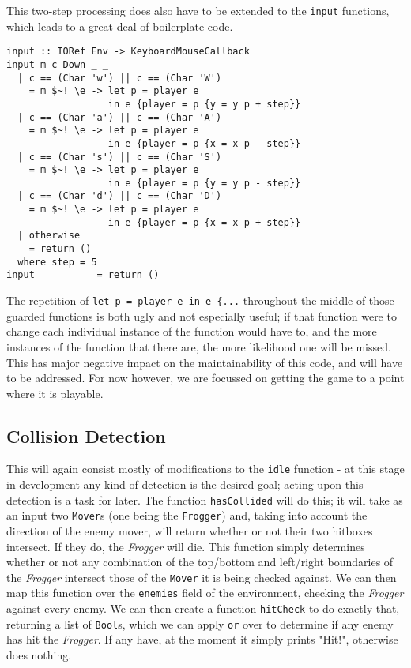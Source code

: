 \documentclass[12pt, a4paper]{report}
\begin{document}
This two-step processing does also have to be extended to the \verb|input| functions, which leads to a great deal of boilerplate code.

\begin{lstlisting}
input :: IORef Env -> KeyboardMouseCallback
input m c Down _ _
  | c == (Char 'w') || c == (Char 'W')
    = m $~! \e -> let p = player e
                  in e {player = p {y = y p + step}}
  | c == (Char 'a') || c == (Char 'A')
    = m $~! \e -> let p = player e
                  in e {player = p {x = x p - step}}
  | c == (Char 's') || c == (Char 'S')
    = m $~! \e -> let p = player e
                  in e {player = p {y = y p - step}}
  | c == (Char 'd') || c == (Char 'D')
    = m $~! \e -> let p = player e
                  in e {player = p {x = x p + step}}
  | otherwise
    = return ()
  where step = 5
input _ _ _ _ _ = return ()
\end{lstlisting}

The repetition of \verb|let p = player e in e {...| throughout the middle of those guarded functions is both ugly and not especially useful; if that function were to change each individual instance of the function would have to, and the more instances of the function that there are, the more likelihood one will be missed.
This has major negative impact on the maintainability of this code, and will have to be addressed.
For now however, we are focussed on getting the game to a point where it is playable.

\subsection{Collision Detection}

This will again consist mostly of modifications to the \verb|idle| function - at this stage in development any kind of detection is the desired goal; acting upon this detection is a task for later.
The function \verb|hasCollided| will do this; it will take as an input two \verb|Mover|s (one being the \verb|Frogger|) and, taking into account the direction of the enemy mover, will return whether or not their two hitboxes intersect.
If they do, the \textit{Frogger} will die.
This function simply determines whether or not any combination of the top/bottom and left/right boundaries of the \textit{Frogger} intersect those of the \verb|Mover| it is being checked against.
We can then map this function over the \verb|enemies| field of the environment, checking the \textit{Frogger} against every enemy.
We can then create a function \verb|hitCheck| to do exactly that, returning a list of \verb|Bool|s, which we can apply \verb|or| over to determine if any enemy has hit the \textit{Frogger}.
If any have, at the moment it simply prints "Hit!", otherwise does nothing.
\end{document}
